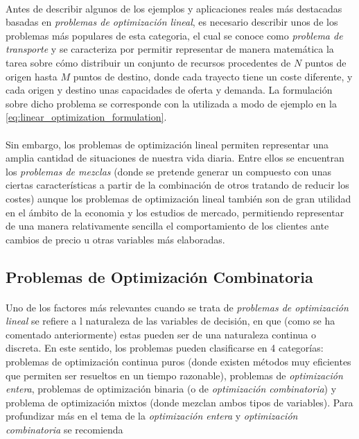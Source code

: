 \documentclass{subfiles}
\begin{document}
        \paragraph{}
        Antes de describir algunos de los ejemplos y aplicaciones reales más destacadas basadas en \emph{problemas de optimización lineal}, es necesario describir unos de los problemas más populares de esta categoria, el cual se conoce como \emph{problema de transporte} y se caracteriza por permitir representar de manera matemática la tarea sobre cómo distribuir un conjunto de recursos procedentes de $N$ puntos de origen hasta $M$ puntos de destino, donde cada trayecto tiene un coste diferente, y cada origen y destino unas capacidades de oferta y demanda. La formulación sobre dicho problema se corresponde con la utilizada a modo de ejemplo en la \cref{eq:linear_optimization_formulation}.

        \paragraph{}
        Sin embargo, los problemas de optimización lineal permiten representar una amplia cantidad de situaciones de nuestra vida diaria. Entre ellos se encuentran los \emph{problemas de mezclas} (donde se pretende generar un compuesto con unas ciertas características a partir de la combinación de otros tratando de reducir los costes) aunque los problemas de optimización lineal también son de gran utilidad en el ámbito de la economia y los estudios de mercado, permitiendo representar de una manera relativamente sencilla el comportamiento de los clientes ante cambios de precio u otras variables más elaboradas.

      \subsection{Problemas de Optimización Combinatoria}
      \label{sec:formulation_combinatorial_problems}

        \paragraph{}
        Uno de los factores más relevantes cuando se trata de \emph{problemas de optimización lineal} se refiere a l naturaleza de las variables de decisión, en que (como se ha comentado anteriormente) estas pueden ser de una naturaleza continua o discreta. En este sentido, los problemas pueden clasificarse en 4 categorías: problemas de optimización continua puros (donde existen métodos muy eficientes que permiten ser resueltos en un tiempo razonable), problemas de \emph{optimización entera}, problemas de optimización binaria (o de \emph{optimización combinatoria}) y problema de optimización mixtos (donde mezclan ambos tipos de variables). Para profundizar más en el tema de la \emph{optimización entera} y \emph{optimización combinatoria} se recomienda \cite{wolsey2014integer}
\end{document}
